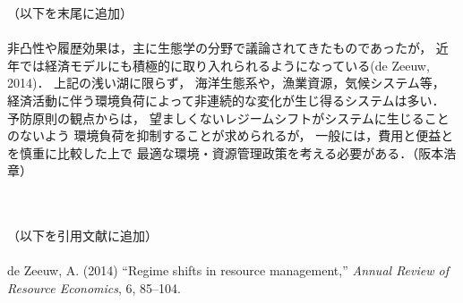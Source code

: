 \documentclass[11pt,a4paper]{article}
\begin{document}
\noindent
（以下を末尾に追加）\ \\
\ \\
非凸性や履歴効果は，主に生態学の分野で議論されてきたものであったが，
近年では経済モデルにも積極的に取り入れられるようになっている(de Zeeuw, 2014)．
上記の浅い湖に限らず，
海洋生態系や，漁業資源，気候システム等，
経済活動に伴う環境負荷によって非連続的な変化が生じ得るシステムは多い．
予防原則の観点からは，
望ましくないレジームシフトがシステムに生じることのないよう
環境負荷を抑制することが求められるが，
一般には，費用と便益とを慎重に比較した上で
最適な環境・資源管理政策を考える必要がある．（阪本浩章）

\ \\
\ \\
\noindent
（以下を引用文献に追加）\ \\
\ \\
de Zeeuw, A. (2014) ``Regime shifts in resource management,''
\textit{Annual Review of Resource Economics}, 6, 85--104.
\end{document}
